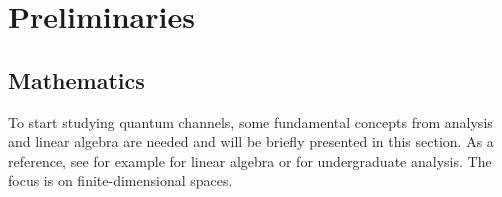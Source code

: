 \chapter{Preliminaries}
\label{chap:2_general_preliminaries}

\section{Mathematics}\label{sec:math}

To start studying quantum channels, some fundamental concepts from analysis and linear algebra are needed and will be briefly presented in this section. As a reference, see for example \cite{Axler2024} for linear algebra or \cite{Abbott2015} for undergraduate analysis. The focus is on finite-dimensional spaces.




